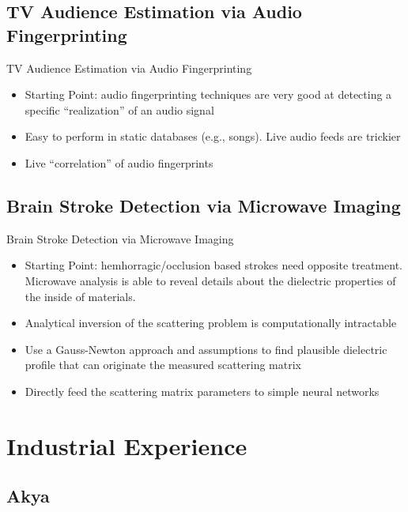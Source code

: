 \documentclass{if-beamer}
\begin{document}
\subsection{TV Audience Estimation via Audio Fingerprinting}
\begin{frame}
TV Audience Estimation via Audio Fingerprinting


\begin{itemize}
\item Starting Point: audio fingerprinting techniques are very good at detecting a specific ``realization'' of an audio signal 
\item Easy to perform in static databases (e.g., songs). Live audio feeds are trickier
\item Live ``correlation'' of audio fingerprints 
\end{itemize}
\end{frame}


\subsection{Brain Stroke Detection via Microwave Imaging}
\begin{frame}
Brain Stroke Detection via Microwave Imaging


\begin{itemize}
\item Starting Point: hemhorragic/occlusion based strokes need opposite treatment. Microwave analysis is able to reveal details about the dielectric properties of the inside of materials.
\item Analytical inversion of the scattering problem is computationally intractable 
\item Use a Gauss-Newton approach and assumptions to find plausible dielectric profile that can originate the measured scattering matrix
\item Directly feed the scattering matrix parameters to simple neural networks
\end{itemize}
\end{frame}
\fi

\section{Industrial Experience}
\subsection{Akya}
\iffalse
\begin{frame}
AKYA's core business was a novel ``dynamically reconfigurable logic'' approach to hardware design, for low power/low cost applications, unlike e.g. FPGA, providing ``just enough'' reconfigurability to meet design requirements. 
At AKYA I contributed as a software engineer to the codebase of a framework to synthesise logic from a high-level description of the hardware. My role was to design and develop algorithms and software components that expand and integrate the existing framework, as well as creating tools for testing and data visualization
\end{frame}
\fi
\end{document}
